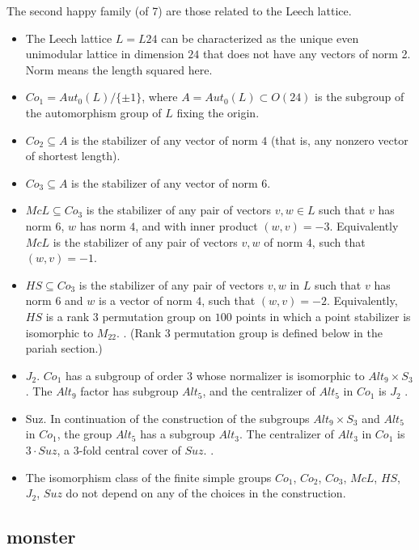 The second happy family (of 7) are those related to the Leech lattice.
\begin{itemize}
\item The Leech lattice $L=L24$ can be characterized as the unique
  even unimodular lattice in dimension $24$ that does not have any
  vectors of norm 2.  Norm means the length squared here.
\item $Co_1 = Aut_0(L)/\{\pm 1\}$, where $A=Aut_0(L) \subset O(24)$ is
  the subgroup of the automorphism group of $L$ fixing the origin.
\item $Co_2 \subseteq A$ is the stabilizer of any vector of norm $4$
  (that is, any nonzero vector of shortest length).
\item $Co_3 \subseteq  A$ is the stabilizer of any vector of norm $6$.
\item $McL \subseteq Co_3$ is the stabilizer of any pair of vectors
  $v,w\in L$ such that $v$ has norm $6$, $w$ has norm $4$, and with
  inner product $(w,v) = -3$.  Equivalently $McL$ is the stabilizer of
  any pair of vectors $v,w$ of norm $4$, such that $(w,v) = -1$.
\item $HS \subseteq Co_3$ is the stabilizer of any pair of vectors
  $v,w$ in $L$ such that $v$ has norm $6$ and $w$ is a vector of norm
  $4$, such that $(w,v) = -2$.  Equivalently, $HS$ is a rank $3$
  permutation group on $100$ points in which a point stabilizer is
  isomorphic to $M_{22}$. \cite[p.116]{robert1998twelve}.  (Rank $3$
  permutation group is defined below in the pariah section.)
\item $J_2$.  $Co_1$ has a subgroup of order $3$ whose normalizer is
  isomorphic to $Alt_9 \times S_3$.  The $Alt_9$ factor has subgroup
  $Alt_5$, and the centralizer of $Alt_5$ in $Co_1$ is $J_2$
  \cite[p.218]{wilson2009finite}.
\item Suz.  In continuation of the construction of the subgroups
  $Alt_9 \times S_3$ and $Alt_5$ in $Co_1$, the group $Alt_5$ has a
  subgroup $Alt_3$.  The centralizer of $Alt_3$ in $Co_1$ is $3\cdot
  Suz$, a $3$-fold central cover of $Suz$.
  \cite[p.218]{wilson2009finite}.
\item The isomorphism class of the finite simple groups $Co_1$,
  $Co_2$, $Co_3$, $McL$, $HS$, $J_2$, $Suz$ do not depend on any of
  the choices in the construction.
\end{itemize}

\subsection{monster}  \label{monster}

